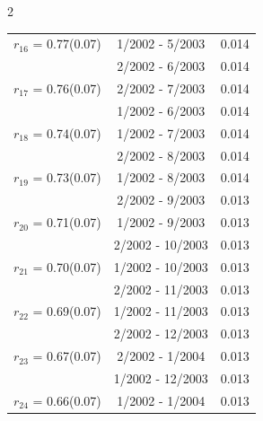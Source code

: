 \begin{multicols}{2}
{\begin{tabular}{ccc}
  $r_{16}$ = 0.77(0.07) &       1/2002 -  5/2003 &        0.014   \vspace{-.10in} \\  
&        2/2002 -  6/2003 &        0.014  \vspace{-.02in} \\ \hline 
  $r_{17}$ = 0.76(0.07) &       2/2002 -  7/2003 &        0.014   \vspace{-.10in} \\  
&        1/2002 -  6/2003 &        0.014  \vspace{-.02in} \\ \hline 
  $r_{18}$ = 0.74(0.07) &       1/2002 -  7/2003 &        0.014   \vspace{-.10in} \\  
&        2/2002 -  8/2003 &        0.014  \vspace{-.02in} \\ \hline 
  $r_{19}$ = 0.73(0.07) &       1/2002 -  8/2003 &        0.014   \vspace{-.10in} \\  
&        2/2002 -  9/2003 &        0.013  \vspace{-.02in} \\ \hline 
  $r_{20}$ = 0.71(0.07) &       1/2002 -  9/2003 &        0.013   \vspace{-.10in} \\  
&        2/2002 - 10/2003 &        0.013  \vspace{-.02in} \\ \hline 
  $r_{21}$ = 0.70(0.07) &       1/2002 - 10/2003 &        0.013   \vspace{-.10in} \\  
&        2/2002 - 11/2003 &        0.013  \vspace{-.02in} \\ \hline 
  $r_{22}$ = 0.69(0.07) &       1/2002 - 11/2003 &        0.013   \vspace{-.10in} \\  
&        2/2002 - 12/2003 &        0.013  \vspace{-.02in} \\ \hline 
  $r_{23}$ = 0.67(0.07) &       2/2002 -  1/2004 &        0.013   \vspace{-.10in} \\  
&        1/2002 - 12/2003 &        0.013  \vspace{-.02in} \\ \hline 
  $r_{24}$ = 0.66(0.07) &       1/2002 -  1/2004 &        0.013   \vspace{-.10in} \\  

\end{tabular}}
\end{multicols}
